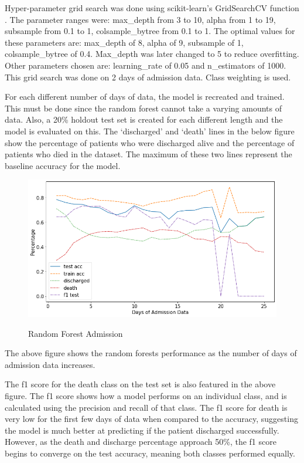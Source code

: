 \documentclass[12pt]{article}
\begin{document}
Hyper-parameter grid search was done using  scikit-learn's GridSearchCV function \cite{scikit-learn}. The parameter ranges were: max\_depth from 3 to 10, alpha from 1 to 19, subsample from 0.1 to 1, colsample\_bytree from 0.1 to 1. The optimal values for these parameters are: max\_depth of 8, alpha of 9, subsample of 1, colsample\_bytree of 0.4. Max\_depth was later changed to 5 to reduce overfitting. Other parameters chosen are: learning\_rate of 0.05 and n\_estimators of 1000. This grid search was done on 2 days of admission data. Class weighting is used.

For each different number of days of data, the model is recreated and trained. This must be done since the random forest cannot take a varying amounts of data. Also, a 20\% holdout test set is created for each different length and the model is evaluated on this. The `discharged' and `death' lines in the below figure show the percentage of patients who were discharged alive and the percentage of patients who died in the dataset. The maximum of these two lines represent the baseline accuracy for the model. 

\begin{figure}[H]
\centering\caption{Random Forest Admission}
\includegraphics[scale=0.45]{Random Forest Admission.png}
\label{Random Forest Admission}
\end{figure}
The above figure shows the random forests performance as the number of days of admission data increases. 

The f1 score for the death class on the test set is also featured in the above figure. The f1 score shows how a model performs on an individual class, and is calculated using the precision and recall of that class. The f1 score for death is very low for the first few days of data when compared to the accuracy, suggesting the model is much better at predicting if the patient discharged successfully. However, as the death and discharge percentage approach 50\%, the f1 score begins to converge on the test accuracy, meaning both classes performed equally. %
\end{document}
